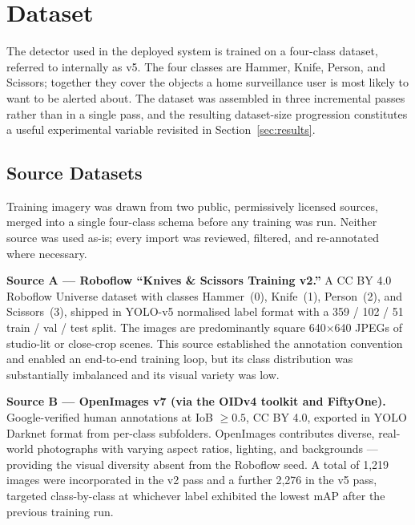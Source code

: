\documentclass{ieeeaccess}
\begin{document}
\section{Dataset}
\label{sec:dataset}
The detector used in the deployed system is trained on a four-class dataset, referred to internally as v5. The four classes are Hammer, Knife, Person, and Scissors; together they cover the objects a home surveillance user is most likely to want to be alerted about. The dataset was assembled in three incremental passes rather than in a single pass, and the resulting dataset-size progression constitutes a useful experimental variable revisited in Section~\ref{sec:results}.

\subsection{Source Datasets}
\label{sec:sources}
Training imagery was drawn from two public, permissively licensed sources, merged into a single four-class schema before any training was run. Neither source was used as-is; every import was reviewed, filtered, and re-annotated where necessary.

\textbf{Source A --- Roboflow ``Knives \& Scissors Training v2.''} A CC BY 4.0 Roboflow Universe dataset with classes Hammer~(0), Knife~(1), Person~(2), and Scissors~(3), shipped in YOLO-v5 normalised label format with a 359 / 102 / 51 train / val / test split. The images are predominantly square 640$\times$640 JPEGs of studio-lit or close-crop scenes. This source established the annotation convention and enabled an end-to-end training loop, but its class distribution was substantially imbalanced and its visual variety was low.

\textbf{Source B --- OpenImages v7 (via the OIDv4 toolkit and FiftyOne).} Google-verified human annotations at IoB $\geq 0.5$, CC BY 4.0, exported in YOLO Darknet format from per-class subfolders. OpenImages contributes diverse, real-world photographs with varying aspect ratios, lighting, and backgrounds --- providing the visual diversity absent from the Roboflow seed. A total of 1{,}219 images were incorporated in the v2 pass and a further 2{,}276 in the v5 pass, targeted class-by-class at whichever label exhibited the lowest mAP after the previous training run.
\end{document}
